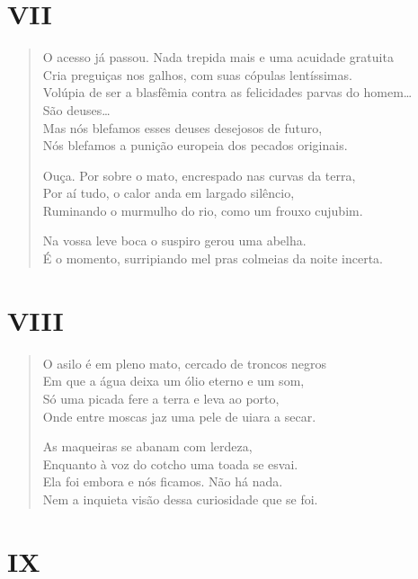 \medskip
\section*{VII}

\begin{verse}
O acesso já passou. Nada trepida mais e uma acuidade gratuita\\
Cria preguiças nos galhos, com suas cópulas lentíssimas.\\
Volúpia de ser a blasfêmia contra as felicidades parvas do homem\ldots{}\\
São deuses\ldots{}\\
Mas nós blefamos esses deuses desejosos de futuro,\\
Nós blefamos a punição europeia dos pecados originais.

Ouça. Por sobre o mato, encrespado nas curvas da terra,\\
Por aí tudo, o calor anda em largado silêncio,\\
Ruminando o murmulho do rio, como um frouxo cujubim.

Na vossa leve boca o suspiro gerou uma abelha.\\
É o momento, surripiando mel pras colmeias da noite incerta.
\end{verse}

\medskip
\section*{VIII}

\begin{verse}
O asilo é em pleno mato, cercado de troncos negros\\
Em que a água deixa um ólio eterno e um som,\\
Só uma picada fere a terra e leva ao porto,\\
Onde entre moscas jaz uma pele de uiara a secar.

As maqueiras se abanam com lerdeza,\\
Enquanto à voz do cotcho uma toada se esvai.\\
Ela foi embora e nós ficamos. Não há nada.\\
Nem a inquieta visão dessa curiosidade que se foi.
\end{verse}

\medskip
\section*{IX}

